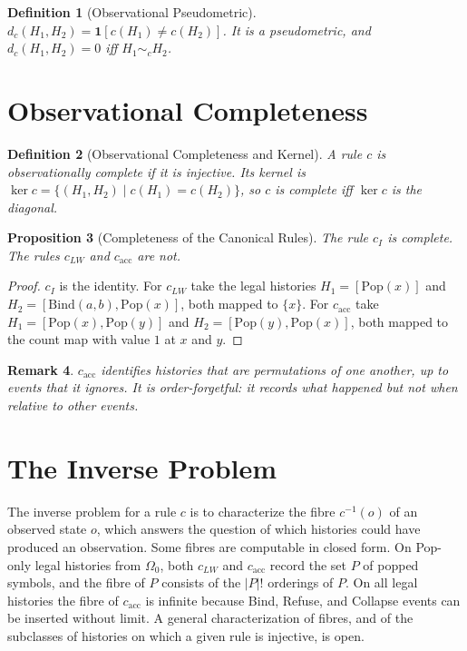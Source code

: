 \documentclass[12pt,oneside,openany]{book}
\theoremstyle{spherepop}
\newtheorem{definition}{Definition}[chapter]
\newtheorem{proposition}[definition]{Proposition}
\theoremstyle{remarkstyle}
\newtheorem{remark}[definition]{Remark}
\newcommand{\Pop}{\mathrm{Pop}}
\newcommand{\Bind}{\mathrm{Bind}}
\begin{document}
\begin{definition}[Observational Pseudometric]
$d_c(H_1,H_2)=\mathbf 1[c(H_1)\ne c(H_2)]$. It is a pseudometric, and $d_c(H_1,H_2)=0$ iff $H_1\sim_cH_2$.
\end{definition}

\section{Observational Completeness}

\begin{definition}[Observational Completeness and Kernel]
A rule $c$ is \emph{observationally complete} if it is injective. Its \emph{kernel} is $\ker c=\{(H_1,H_2)\mid c(H_1)=c(H_2)\}$, so $c$ is complete iff $\ker c$ is the diagonal.
\end{definition}

\begin{proposition}[Completeness of the Canonical Rules]
The rule $c_I$ is complete. The rules $c_{LW}$ and $c_{\mathrm{acc}}$ are not.
\end{proposition}

\begin{proof}
$c_I$ is the identity. For $c_{LW}$ take the legal histories $H_1=[\Pop(x)]$ and $H_2=[\Bind(a,b),\Pop(x)]$, both mapped to $\{x\}$. For $c_{\mathrm{acc}}$ take $H_1=[\Pop(x),\Pop(y)]$ and $H_2=[\Pop(y),\Pop(x)]$, both mapped to the count map with value $1$ at $x$ and $y$.
\end{proof}

\begin{remark}
$c_{\mathrm{acc}}$ identifies histories that are permutations of one another, up to events that it ignores. It is order-forgetful: it records what happened but not when relative to other events.
\end{remark}

\section{The Inverse Problem}

The inverse problem for a rule $c$ is to characterize the fibre $c^{-1}(o)$ of an observed state $o$, which answers the question of which histories could have produced an observation. Some fibres are computable in closed form. On Pop-only legal histories from $\Omega_0$, both $c_{LW}$ and $c_{\mathrm{acc}}$ record the set $P$ of popped symbols, and the fibre of $P$ consists of the $|P|!$ orderings of $P$. On all legal histories the fibre of $c_{\mathrm{acc}}$ is infinite because Bind, Refuse, and Collapse events can be inserted without limit. A general characterization of fibres, and of the subclasses of histories on which a given rule is injective, is open.
\end{document}
